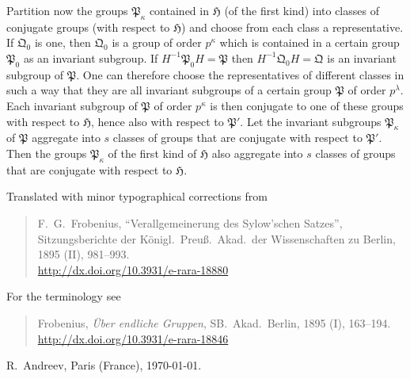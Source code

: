 \documentclass[a5paper,12pt]{article}
\let\fr\mathfrak
\newcommand{\CH}{\fr{H}}
\newcommand{\CP}{\fr{P}}
\newcommand{\CQ}{\fr{Q}}
\newcommand{\?}{{\color{blue}${}^{(?)}$}}
\begin{document}

Partition now
the groups $\CP_\kappa$
contained in $\CH$
(of the first kind)
into classes
of conjugate groups
(with respect to $\CH$)
and
choose
from each class a representative.
%
%
If $\CQ_0$ is one,
then $\CQ_0$ is a group of order $p^\kappa$
which
is contained in a certain group $\CP_0$
as an invariant subgroup.
%
%
If $H^{-1} \CP_0 H = \CP$
then $H^{-1} \CQ_0 H = \CQ$
is an invariant subgroup of $\CP$.
%
%
One can therefore
choose the representatives
of different classes
in such a way
that
they are all invariant subgroups
of a certain group $\CP$ of order $p^\lambda$.
%
%
Each invariant subgroup of $\CP$
of order $p^\kappa$
is then conjugate
to one of these groups
with respect to $\CH$,
hence also
with respect to $\CP'$.
%
%
Let
the invariant subgroups $\CP_\kappa$ of $\CP$
aggregate
into $s$ classes of groups
that are conjugate
with respect to $\CP'$.
%
%
Then the groups $\CP_\kappa$
of the first kind
of $\CH$
also
aggregate
into $s$ classes of groups
that are conjugate
with respect to $\CH$.



\vfill

\noindent
\begin{minipage}{\textwidth}
{\footnotesize

\noindent
Translated with minor typographical corrections from
\begin{quote}
	F.~G.~Frobenius,
	``Verallgemeinerung des Sylow'schen Satzes'',
	Sitzungsberichte der
	K\"onigl.~Preu\ss.~Akad.~der Wissenschaften
	zu Berlin,
	1895 (II),
	981--993.
	\\
	\href{http://dx.doi.org/10.3931/e-rara-18880}{http://dx.doi.org/10.3931/e-rara-18880}
\end{quote}

\noindent
For the terminology see
\begin{quote}Frobenius,
	\emph{\"Uber endliche Gruppen},
	SB.~Akad.~Berlin,
	1895 (I),
	163--194.
	\\
	\href{http://dx.doi.org/10.3931/e-rara-18846}{http://dx.doi.org/10.3931/e-rara-18846}
\end{quote}

R.~Andreev,
Paris (France),
\today.
}
\end{minipage}




\end{document}
